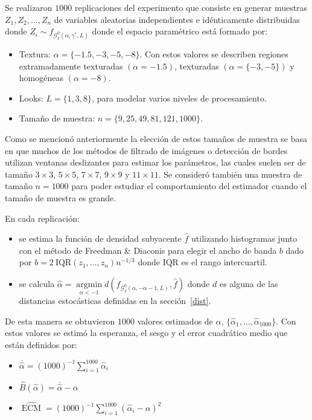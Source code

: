 Se realizaron $1000$ replicaciones del experimento que consiste en generar muestras $Z_1, Z_2,\ldots,Z_n$ de variables aleatorias independientes e idénticamente distribuidas donde $Z_i \sim f_{\mathcal{G}_I^0(\alpha,\gamma^*,L)}$ donde el espacio paramétrico está formado por:

\begin{itemize}
	\item Textura: $\alpha=\{-1.5, -3, -5, -8\}$. Con estos valores se describen regiones extramadamente texturadas $(\alpha=-1.5)$, texturadas $(\alpha=\{-3,-5\})$ y homogéneas $(\alpha=-8)$. 
	\item Looks: $L=\{1,3,8\}$, para modelar varios niveles de procesamiento.
	\item Tamaño de muestra: $n=\{9, 25,49, 81,121,1000\}$. 
\end{itemize}

Como se mencionó anteriormente la elección de estos tamaños de muestra se basa en que muchos de los métodos de filtrado de imágenes o detección de bordes utilizan ventanas deslizantes para estimar los parámetros, las cuales suelen ser de tamaño $3 \times 3$,  $5 \times 5$, $7 \times 7$, $9 \times 9$ y  $11 \times 11$. Se consideró también una muestra de tamaño $n=1000$ para poder estudiar el comportamiento del estimador cuando el tamaño de muestra es grande. 

En cada replicación:
\begin{itemize}
	\item se estima la función de densidad subyacente $\widehat{f}$ utilizando histogramas junto con el método de Freedman \& Diaconis para elegir el ancho de banda $b$ dado por $b=2 \ \text{IQR}(z_1,\ldots,z_n) n^{-1/3}$ donde $\text{IQR}$ es el rango intercuartil.
	\item se calcula $\widehat{\alpha}= \mathop{\text{argmin}}\limits_{\alpha<-1}d(f_{\mathcal{G}_I^0(\alpha,-\alpha-1,L)},\widehat{f})$ donde $d$ es alguna de las distancias estocásticas definidas en la sección~\ref{dist}.
\end{itemize} 

De esta manera se obtuvieron $1000$ valores estimados de $\alpha$, $\{\widehat{\alpha}_1, \dots, \widehat{\alpha}_{1000}\}$. Con estos valores se estimó la esperanza, el sesgo y el error cuadrático medio que están definidos por:

\begin{itemize}
	\item $\overline{\widehat{\alpha}}=(1000)^{-1}{\sum_{i=1}^{1000}{\widehat{\alpha}_i}}$
	\item $\widehat{B}(\widehat\alpha) = \overline{\widehat\alpha}- \alpha$
	\item $\widehat{\operatorname{\text{ECM}}}=({1000})^{-1}{\sum_{i=1}^{1000}{(\widehat{\alpha}_i-\alpha)^2}}$
\end{itemize}

